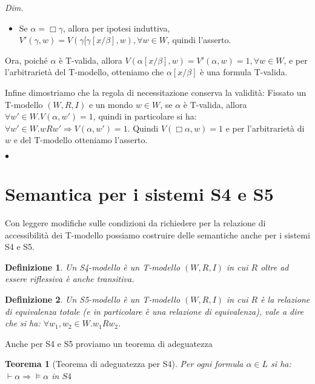 \documentclass[a4paper, titlepage, 12pt]{report}
\newtheorem{theorem}{Teorema}[chapter]
\newtheorem{definition}{Definizione}[chapter]
\newenvironment{proof}
    {\textit{Dim.}
    }
    {\begin{flushright}$\bullet$\end{flushright}
    }
\begin{document}
\begin{proof}
\begin{itemize}
\item Se $\alpha = \Box \gamma$, allora per ipotesi induttiva,
      $V'(\gamma, w) = V(\gamma[\gamma[x/\beta], w), \forall w \in W$,
      quindi l'asserto.

\end{itemize}

Ora, poiché $\alpha$ è T-valida, allora $V(\alpha[x/\beta], w) = V'(\alpha, w) = 1, \forall w \in W$,
e per l'arbitrarietà del T-modello, otteniamo che $\alpha[x/\beta]$ è una formula T-valida.

Infine dimostriamo che la regola di necessitazione conserva la validità:
Fissato un T-modello $(W, R, I)$ e un mondo $w \in W$,
se $\alpha$ è T-valida, allora $\forall w' \in W.V(\alpha, w') = 1$,
quindi in particolare si ha: $\forall w' \in W. wRw' \Rightarrow V(\alpha, w') = 1$.
Quindi $V(\Box \alpha, w) = 1$ e per l'arbitrarietà di $w$ e del T-modello otteniamo l'asserto.

\end{proof}

\section{Semantica per i sistemi S4 e S5}
Con leggere modifiche sulle condizioni da richiedere
per la relazione di accessibilità dei T-modello possiamo costruire delle semantiche
anche per i sistemi S4 e S5.

\begin{definition}
Un S4-modello è un T-modello $(W, R, I)$ in cui $R$ oltre ad essere riflessiva è anche transitiva.
\end{definition}

\begin{definition}
Un S5-modello è un T-modello $(W, R, I)$ in cui $R$ è la relazione di equivalenza totale
(e in particolare è una relazione di equivalenza),
vale a dire che si ha: $\forall w_1, w_2 \in W. w_1 R w_2$.
\end{definition}

Anche per S4 e S5 proviamo un teorema di adeguatezza

\begin{theorem}[Teorema di adeguatezza per S4]
Per ogni formula $\alpha \in L$ si ha: $\vdash \alpha \Rightarrow \vDash \alpha$ in $S4$
\end{theorem}
\end{document}
